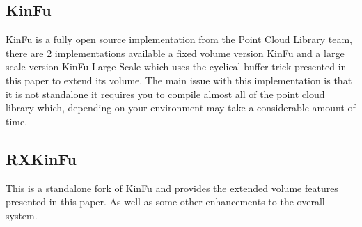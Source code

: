 \documentclass[10pt, twocolumn]{article}
\begin{document}
\subsection{KinFu}
KinFu is a fully open source implementation from the Point Cloud Library team, there are 2 implementations available a fixed volume version KinFu and a large scale version KinFu Large Scale which uses the cyclical buffer trick presented in this paper to extend its volume. The main issue with this implementation is that it is not standalone it requires you to compile almost all of the point cloud library which, depending on your environment may take a considerable amount of time.

\subsection{RXKinFu}
This is a standalone fork of KinFu and provides the extended volume features presented in this paper. As well as some other enhancements to the overall system.






\end{document}
